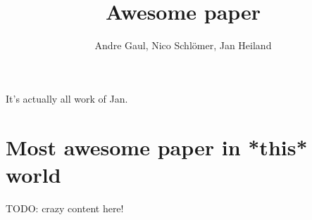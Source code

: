 \documentclass[a4paper,10pt]{article}
\title{Awesome paper}
\author{Andre Gaul, Nico Schlömer, Jan Heiland}
\begin{document}
It's actually all work of Jan.
\maketitle
\tableofcontents

\section{Most awesome paper in *this* world}
TODO: crazy content here!



\end{document}

